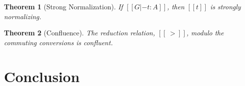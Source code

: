 \documentclass{article}
\newtheorem{theorem}{Theorem}
\begin{document}
\begin{theorem}[Strong Normalization]
  \label{theorem:strong_normalization_lambdaL!k}
  If $[[G |- t : A]]$, then $[[t]]$ is strongly normalizing.
\end{theorem}

\begin{theorem}[Confluence]
  \label{thm:confluence-lambdaL!k}
  The reduction relation, $[[~>]]$, modulo the commuting conversions
  is confluent.
\end{theorem}


\section{Conclusion}







\end{document}
